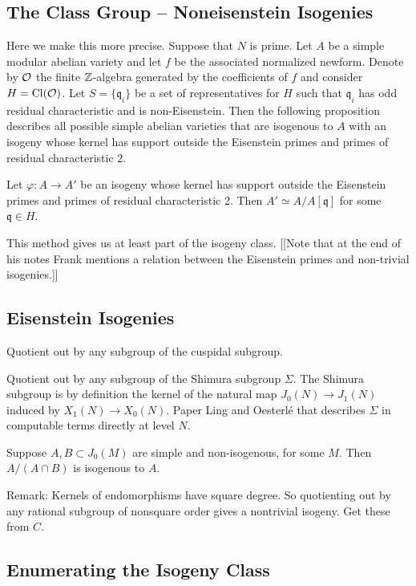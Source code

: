 \documentclass{article}
\begin{document}
\subsection{The Class Group -- Noneisenstein Isogenies}
\label{sec:clgp}
Here we make this more precise. Suppose that $N$ is prime. Let $A$ be
a simple modular abelian variety and let $f$ be the associated
normalized newform. Denote by $\mathcal{O}$ the finite $\mathbb{Z}$-algebra generated
by the coefficients of $f$ and consider $H = \operatorname{Cl}(\mathcal{O})$.  Let $S =
\{\mathfrak{q}_i \}$ be a set of representatives for $H$ such that
$\mathfrak{q}_i$ has odd residual characteristic and is
non-Eisenstein. Then the following proposition describes all possible
simple abelian varieties that are isogenous to $A$ with an isogeny
whose kernel has support outside the Eisenstein primes and primes of
residual characteristic 2.

\begin{proposition}\label{prop:noneis}
Let $\varphi : A \to A'$ be an isogeny whose kernel has support outside the
Eisenstein primes and primes of residual characteristic 2. Then $A' \simeq
A/A[\mathfrak{q}]$ for some $\mathfrak{q} \in H$.
\end{proposition}

This method gives us at least part of the isogeny class.  [[Note that at the
end of his notes Frank mentions a relation between the Eisenstein
primes and non-trivial isogenies.]]


\subsection{Eisenstein Isogenies}
Quotient out by any subgroup of the cuspidal subgroup.

Quotient out by any subgroup of the Shimura subgroup $\Sigma$.
The Shimura subgroup is by definition the kernel of the natural
map $J_0(N)\to J_1(N)$ induced by $X_1(N)\to X_0(N)$.
Paper Ling and Oesterl\'e that describes $\Sigma$
in computable terms directly at level $N$.

Suppose $A, B\subset J_0(M)$ are simple and non-isogenous,
for some $M$. Then $A/(A\cap{}B)$ is isogenous to $A$.

Remark: Kernels of endomorphisms have square degree.
So quotienting out by any rational subgroup of
nonsquare order gives a nontrivial isogeny.  Get these from $C$.

\subsection{Enumerating the Isogeny Class}
\end{document}

